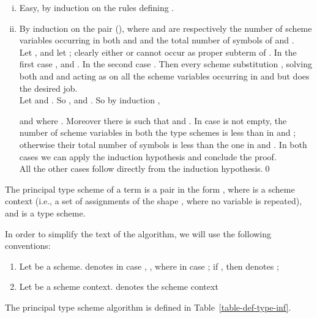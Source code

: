 \proof\hfill
\begin{enumerate}[i)]
\item Easy, by induction on the rules defining .
\item By induction on the pair (), where  and  are respectively the number of scheme variables occurring in
both  and  and the total number of symbols of  and .\\
Let , and let ; clearly 
either  or  cannot occur as proper subterm of . 
In the first case , and
. In the second case
. Then every 
scheme substitution , solving both  and  and acting as  on all the scheme 
variables occurring in  and  but 
does the desired job.\\
Let  and .
So ,
and .
So by induction 
,

and 
where . 
Moreover there is 
such that  and
.
In case  is not empty, the number 
of scheme variables in both the type schemes is less than
in  and ; otherwise their total number of symbols is less than the one in 
 and .
In both cases we can apply the induction hypothesis and conclude the proof.\\
All the other cases follow directly from the induction hypothesis.\qed
\end{enumerate}

The principal type scheme of a term is a pair in the form
, where  is a scheme context (i.e., a set of assignments
of the shape , where no variable is repeated), and  is a
type scheme. 

In order to simplify the text of the algorithm, we will use the following conventions:
\begin{enumerate}[]
\item Let  be a scheme.  denotes  in case ,
, where  in case ; if , then
 denotes ;
\item Let  be a scheme context.  denotes the scheme context 

\end{enumerate}

The principal type scheme algorithm is defined in
Table~\ref{table-def-type-inf}.

